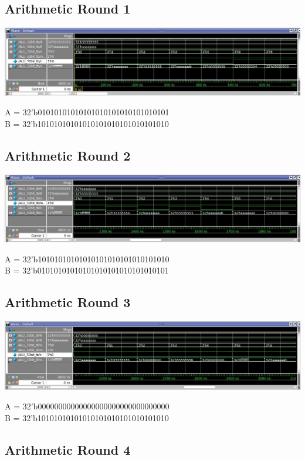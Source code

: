 \documentclass[paper=letter, fontsize=11pt]{scrartcl}
\numberwithin{equation}{section} %
\numberwithin{figure}{section} %
\numberwithin{table}{section} %
\begin{document}
\subsection{Arithmetic Round 1}

	\centering
			\includegraphics[width=1.0\textwidth]{Art1}
				\label{fig:Art1}
\raggedright A = 32'b01010101010101010101010101010101\\  
B = 32'b10101010101010101010101010101010

\subsection{Arithmetic Round 2}

	\centering
			\includegraphics[width=1.0\textwidth]{Art2}
				\label{fig:Art2}
 \raggedright A = 32'b10101010101010101010101010101010\\ 
 B = 32'b01010101010101010101010101010101
 
\subsection{Arithmetic Round 3}

	\centering
			\includegraphics[width=1.0\textwidth]{Art3}
				\label{fig:Art3}
 \raggedright A = 32'b00000000000000000000000000000000\\ 
 B = 32'b10101010101010101010101010101010
 
\subsection{Arithmetic Round 4}
\end{document}
